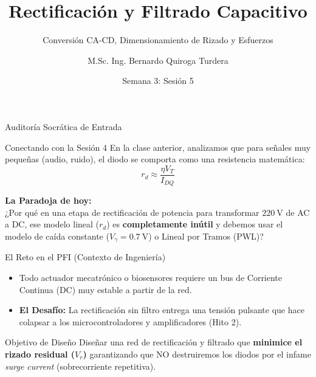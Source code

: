 \documentclass[10pt, aspectratio=169]{beamer}
\title[Rectificación y Filtros]{Rectificación y Filtrado Capacitivo}
\subtitle{Conversión CA-CD, Dimensionamiento de Rizado y Esfuerzos}
\author{M.Sc. Ing. Bernardo Quiroga Turdera}
\institute[UCB Tarija]{Circuitos Electrónicos III (IMT-221)}
\date{Semana 3: Sesión 5}
\begin{document}
\begin{frame}
  \titlepage
\end{frame}

\begin{frame}{Auditoría Socrática de Entrada}
  \begin{block}{Conectando con la Sesión 4}
    En la clase anterior, analizamos que para señales muy pequeñas (audio, ruido), el diodo se comporta como una resistencia matemática:
    \begin{equation*}
        r_d \approx \frac{\eta V_T}{I_{DQ}}
    \end{equation*}
  \end{block}
  \vspace{0.3cm}
  \textbf{La Paradoja de hoy:}\\
  ¿Por qué en una etapa de rectificación de potencia para transformar $\qty{220}{\volt}$ de AC a DC, ese modelo lineal ($r_d$) es \textbf{completamente inútil} y debemos usar el modelo de caída constante ($V_\gamma = \qty{0.7}{\volt}$) o Lineal por Tramos (PWL)?
\end{frame}

\begin{frame}{El Reto en el PFI (Contexto de Ingeniería)}
  \begin{itemize}
      \item Todo actuador mecatrónico o biosensores requiere un bus de Corriente Continua (DC) muy estable a partir de la red.
      \item \textbf{El Desafío:} La rectificación sin filtro entrega una tensión pulsante que hace colapsar a los microcontroladores y amplificadores (Hito 2).
  \end{itemize}
  
  \vspace{0.3cm}
  \begin{block}{Objetivo de Diseño}
      Diseñar una red de rectificación y filtrado que \textbf{minimice el rizado residual ($V_r$)} garantizando que NO destruiremos los diodos por el infame \textit{surge current} (sobrecorriente repetitiva).
  \end{block}
\end{frame}
\end{document}
